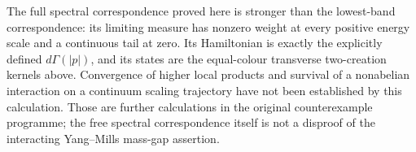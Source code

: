 The full spectral correspondence proved here is stronger than the
lowest-band correspondence: its limiting measure has nonzero
weight at every positive energy scale and a continuous tail at
zero. Its Hamiltonian is exactly the explicitly defined
$d\Gamma(|p|)$, and its states are the equal-colour transverse
two-creation kernels above. Convergence of higher local products
and survival of a nonabelian interaction on a continuum scaling
trajectory have not been established by this calculation. Those
are further calculations in the original counterexample programme;
the free spectral correspondence itself is not a disproof of the
interacting Yang--Mills mass-gap assertion.
